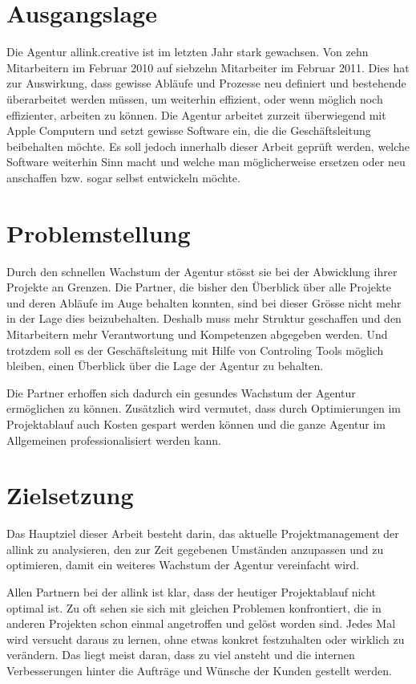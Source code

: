 \section{Ausgangslage}
Die Agentur allink.creative ist im letzten Jahr stark gewachsen. Von zehn
Mitarbeitern im Februar 2010 auf siebzehn Mitarbeiter im Februar 2011. Dies hat 
zur Auswirkung, dass gewisse Abläufe und Prozesse neu definiert und bestehende
überarbeitet werden müssen, um weiterhin effizient, oder wenn möglich noch 
effizienter, arbeiten zu können. Die Agentur arbeitet zurzeit überwiegend mit Apple
Computern und setzt gewisse Software ein, die die Geschäftsleitung beibehalten 
möchte. Es soll jedoch innerhalb dieser Arbeit geprüft werden, welche Software
weiterhin Sinn macht und welche man möglicherweise ersetzen oder neu anschaffen
bzw. sogar selbst entwickeln möchte.

\section{Problemstellung}
Durch den schnellen Wachstum der Agentur stösst sie bei der Abwicklung ihrer
Projekte an Grenzen. Die Partner, die bisher den Überblick über alle
Projekte und deren Abläufe im Auge behalten konnten, sind bei dieser Grösse
nicht mehr in der Lage dies beizubehalten. Deshalb muss mehr Struktur geschaffen und
den Mitarbeitern mehr Verantwortung und Kompetenzen abgegeben werden. Und trotzdem
soll es der Geschäftsleitung mit Hilfe von Controling Tools möglich bleiben,
einen Überblick über die Lage der Agentur zu behalten.

Die Partner erhoffen sich dadurch ein gesundes Wachstum der Agentur ermöglichen
zu können. Zusätzlich wird vermutet, dass durch Optimierungen im Projektablauf
auch Kosten gespart werden können und die ganze Agentur im Allgemeinen 
professionalisiert werden kann.

\section{Zielsetzung}
Das Hauptziel dieser Arbeit besteht darin, das aktuelle Projektmanagement der 
allink zu analysieren, den zur Zeit gegebenen Umständen anzupassen und zu
optimieren, damit ein weiteres Wachstum der Agentur vereinfacht wird.

Allen Partnern bei der allink ist klar, dass der heutiger Projektablauf 
nicht optimal ist. Zu oft sehen sie sich mit gleichen Problemen konfrontiert, 
die in anderen Projekten schon einmal angetroffen und gelöst worden sind.
Jedes Mal wird versucht daraus zu lernen, ohne etwas konkret festzuhalten oder
wirklich zu verändern. Das liegt meist daran, dass zu viel ansteht und
die internen Verbesserungen hinter die Aufträge und Wünsche der Kunden
gestellt werden.

